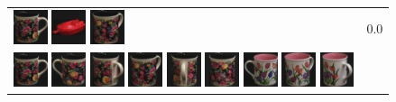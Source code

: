 \begin{figure}[tbp]
\begin{center}
\begin{tabular}{m{11cm} | m{3cm} |}
\includegraphics[width=1cm]{coil/beeld-60.eps}
\includegraphics[width=1cm]{coil/beeld-21.eps}
\includegraphics[width=1cm]{coil/beeld-63.eps}
& {\scriptsize 0.0}
\\
\includegraphics[width=1cm]{coil/beeld-60.eps}
\includegraphics[width=1cm]{coil/beeld-61.eps}
\includegraphics[width=1cm]{coil/beeld-64.eps}
\includegraphics[width=1cm]{coil/beeld-63.eps}
\includegraphics[width=1cm]{coil/beeld-65.eps}
\includegraphics[width=1cm]{coil/beeld-62.eps}
\includegraphics[width=1cm]{coil/beeld-7.eps}
\includegraphics[width=1cm]{coil/beeld-9.eps}
\includegraphics[width=1cm]{coil/beeld-10.eps}

\end{tabular}
\end{center}
\end{figure}

